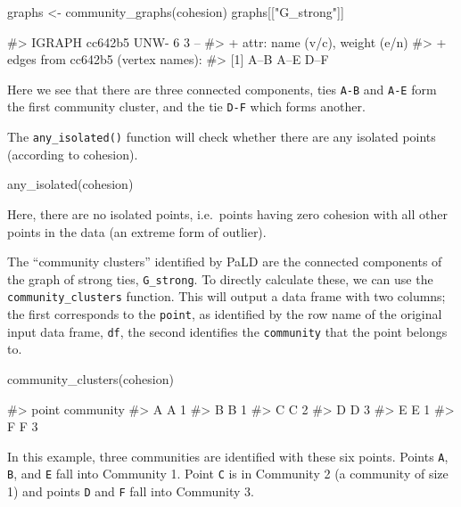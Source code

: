 \begin{Schunk}
\begin{Sinput}
graphs <- community_graphs(cohesion)
graphs[["G_strong"]]
\end{Sinput}
\begin{Soutput}
#> IGRAPH cc642b5 UNW- 6 3 -- 
#> + attr: name (v/c), weight (e/n)
#> + edges from cc642b5 (vertex names):
#> [1] A--B A--E D--F
\end{Soutput}
\end{Schunk}

Here we see that there are three connected components, ties \texttt{A-B}
and \texttt{A-E} form the first community cluster, and the tie
\texttt{D-F} which forms another.

The \texttt{any\_isolated()} function will check whether there are any
isolated points (according to cohesion).

\begin{Schunk}
\begin{Sinput}
any_isolated(cohesion)
\end{Sinput}
\end{Schunk}

\noindent Here, there are no isolated points, i.e.~points having zero
cohesion with all other points in the data (an extreme form of outlier).

The ``community clusters'' identified by PaLD are the connected
components of the graph of strong ties, \texttt{G\_strong}. To directly
calculate these, we can use the \texttt{community\_clusters} function.
This will output a data frame with two columns; the first corresponds to
the \texttt{point}, as identified by the row name of the original input
data frame, \texttt{df}, the second identifies the \texttt{community}
that the point belongs to.

\begin{Schunk}
\begin{Sinput}
community_clusters(cohesion)
\end{Sinput}
\begin{Soutput}
#>   point community
#> A     A         1
#> B     B         1
#> C     C         2
#> D     D         3
#> E     E         1
#> F     F         3
\end{Soutput}
\end{Schunk}

In this example, three communities are identified with these six points.
Points \texttt{A}, \texttt{B}, and \texttt{E} fall into Community 1.
Point \texttt{C} is in Community 2 (a community of size 1) and points
\texttt{D} and \texttt{F} fall into Community 3.

